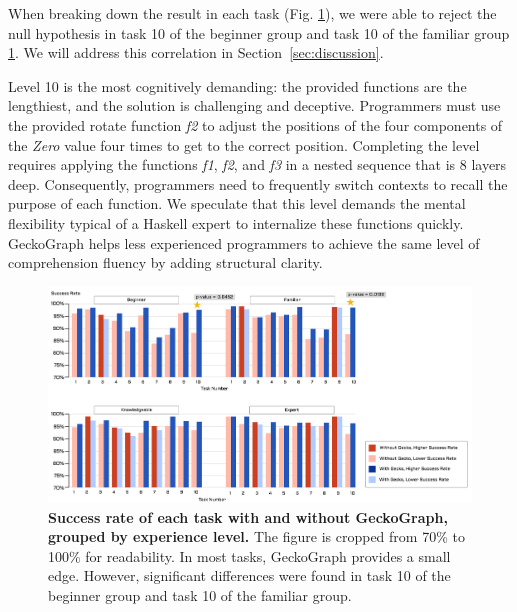 \documentclass[preprint,12pt]{elsarticle}
\begin{document}
When breaking down the result in each task (Fig. \ref{fig:success-rate}), we were able to reject the null hypothesis in task 10 of the beginner group and task 10 of the familiar group \ref{fig:success-rate}. We will address this correlation in Section~\ref{sec:discussion}.

Level 10 is the most cognitively demanding: the provided functions are the lengthiest, and the solution is challenging and deceptive. Programmers must use the provided rotate function {\it f2} to adjust the positions of the four components of the {\it Zero} value four times to get to the correct position. Completing the level requires applying the functions {\it f1}, {\it f2}, and {\it f3} in a nested sequence that is 8 layers deep. Consequently, programmers need to frequently switch contexts to recall the purpose of each function. We speculate that this level demands the mental flexibility typical of a Haskell expert to internalize these functions quickly. GeckoGraph helps less experienced programmers to achieve the same level of comprehension fluency by adding structural clarity.

\begin{figure}[]
  \includegraphics[width=\linewidth]{figures/SuccessfulRate}
  \caption{\label{fig:success-rate}{\bf Success rate of each task with and without GeckoGraph, grouped by experience level.} The figure is cropped from 70\% to 100\% for readability. In most tasks, GeckoGraph provides a small edge. However, significant differences were found in task 10 of the beginner group and task 10 of the familiar group. }
\end{figure}
\end{document}
